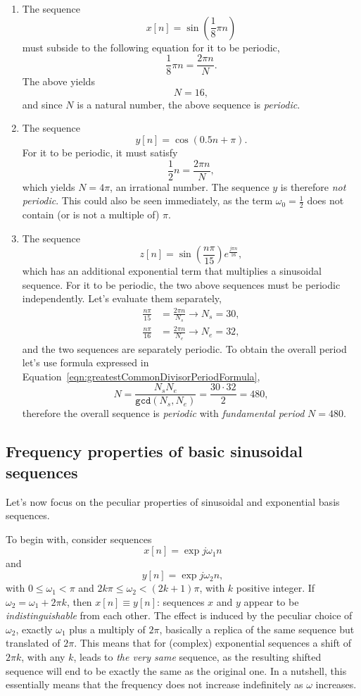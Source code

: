 \documentclass[\documentfontsize, twocolumn]{\classname}
\begin{document}
\begin{enumerate}
	\item The sequence \[x[n] = \sin{(\frac 1 8 \pi n)}\] must subside to
		the following equation for it to be periodic,
		\[
			\frac 1 8 \pi n = \frac {2 \pi n}{N}.
		\]
		The above yields
		\[
			N = 16,
		\]
		and since $N$ is a natural number, the above sequence is \emph{periodic}.
	\item The sequence \[y[n] = \cos{(0.5n + \pi)}.\] For it to be periodic, it must satisfy
		\[
			\frac 1 2 n = \frac{2 \pi n}{N},
		\]
		which yields $N = 4\pi$, an irrational number. The sequence $y$
		is therefore \emph{not periodic}. This could also be seen
		immediately, as the term $\omega_0 = \frac 1 2$ does not
		contain (or is not a multiple of) $\pi$.
	\item The sequence \[z[n] = \sin{(\frac {n\pi}{15})}e^{\frac {j\pi
		n}{16}},\] which has an additional exponential term that
		multiplies a sinusoidal sequence. For it to be periodic, the
		two above sequences must be periodic independently. Let's
		evaluate them separately,
		\begin{align*}
			\frac{n \pi}{15} &= \frac{2 \pi n}{N_s} \longrightarrow N_s = 30,\\
			\frac{n \pi}{16} &= \frac{2 \pi n}{N_e} \longrightarrow N_e = 32,
		\end{align*}
		and the two sequences are separately periodic. To obtain the
		overall period let's use formula expressed in
		Equation~\ref{eqn:greatestCommonDivisorPeriodFormula},
		\[
			N = \frac{N_sN_e}{\mathrm{\texttt{gcd}}(N_s, N_e)} = \frac {30 \cdot 32}{2} = 480,
		\]
		therefore the overall sequence is \emph{periodic} with \emph{fundamental period} $N = 480$.
\end{enumerate}

\subsection{Frequency properties of basic sinusoidal se\-quen\-ces}

Let's now focus on the peculiar properties of sinusoidal and exponential basis se\-quen\-ces.

To begin with, consider se\-quen\-ces \[x[n] = \exp{j \omega_1 n}\] and \[y[n] = \exp{j \omega_2 n},\] with $0 \leq \omega_1 < \pi$ and $2 k \pi \leq \omega_2 < (2k+1)\pi$, with $k$ positive integer. If $\omega_2 = \omega_1 + 2 \pi k$, then $x[n] \equiv y[n]$: se\-quen\-ces $x$ and $y$ appear to be \emph{indistinguishable} from each other. The effect is induced by the peculiar choice of $\omega_2$, exactly $\omega_1$ plus a multiply of $2\pi$, basically a replica of the same sequence but translated of $2\pi$. This means that for (complex) exponential se\-quen\-ces a shift of $2\pi k$, with any $k$, leads to \emph{the very same} se\-quen\-ce, as the resulting shifted se\-quen\-ce will end to be exactly the same as the original one. In a nutshell, this essentially means that the frequency does not increase indefinitely as $\omega$ increases.
\end{document}
